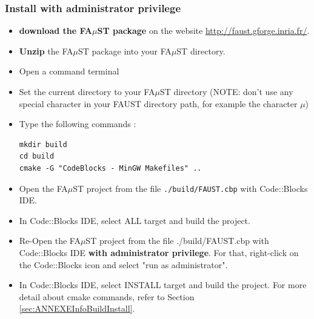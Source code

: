 \subsubsection{Install with administrator privilege}
\label{sec:WinMinGWCodeBlocksAdminBasicInstall}
\begin{itemize}
\item \textbf{download the FA$\mu$ST package} on the website  \url{http://faust.gforge.inria.fr/}. 
\item \textbf{Unzip} the FA$\mu$ST package into your FA$\mu$ST directory. 

\item Open a command terminal
\item Set the current directory to your FA$\mu$ST directory (NOTE: don't use any special character in your FAUST directory path, for example the character $\mu$)
\item Type the following commands : 
\begin{lstlisting}
mkdir build
cd build
cmake -G "CodeBlocks - MinGW Makefiles" .. 
\end{lstlisting}
\item Open the FA$\mu$ST project from the file \texttt{./build/FAUST.cbp} with Code::Blocks IDE.
\item In Code::Blocks IDE, select ALL target and build the project.
\item Re-Open the FA$\mu$ST project from the file ./build/FAUST.cbp with Code::Blocks IDE \textbf{with administrator privilege}. For that, right-click on the Code::Blocks icon and select "run as administrator". 
\item In Code::Blocks IDE, select INSTALL target and build the project.
For more detail about cmake commands, refer to Section \ref{sec:ANNEXEInfoBuildInstall}.
\end{itemize}

